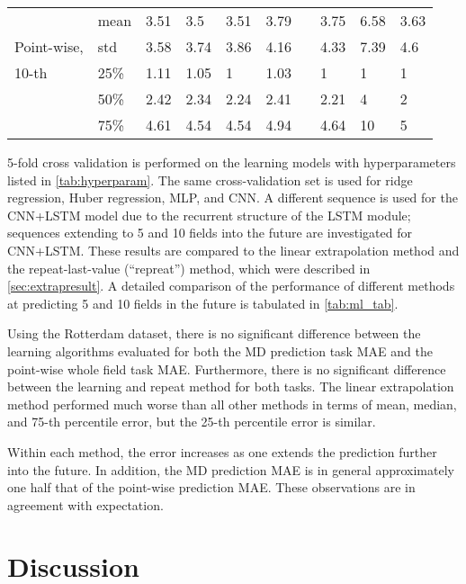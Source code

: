 \begin{table}[t]
\begin{tabular}{@{}llllllllll@{}}
		\midrule
		& mean & 3.51  & 3.5   & 3.51 & 3.79 &          & 3.75      & 6.58   & 3.63   \\
		Point-wise, & std  & 3.58  & 3.74  & 3.86 & 4.16 &          & 4.33      & 7.39   & 4.6    \\
		10-th& 25\% & 1.11  & 1.05  & 1    & 1.03 &          & 1         & 1      & 1      \\
		& 50\% & 2.42  & 2.34  & 2.24 & 2.41 &          & 2.21      & 4      & 2      \\
		& 75\% & 4.61  & 4.54  & 4.54 & 4.94 &          & 4.64      & 10     & 5      \\ \bottomrule
	\end{tabular}
\end{table}

5-fold cross validation is performed on the learning models with hyperparameters listed in \cref{tab:hyperparam}. The same cross-validation set is used for ridge regression, Huber regression, \ac{MLP}, and \ac{CNN}. A different sequence is used for the \acs{CNN}+\acs{LSTM} model due to the recurrent structure of the \ac{LSTM} module; sequences extending to 5 and 10 fields into the future are investigated for \acs{CNN}+\acs{LSTM}. These results are compared to the linear extrapolation method and the repeat-last-value (``repreat'') method, which were described in \cref{sec:extrapresult}. A detailed comparison of the performance of different methods at predicting 5 and 10 fields in the future is tabulated in \cref{tab:ml_tab}.

Using the Rotterdam dataset, there is no significant difference between the learning algorithms evaluated for both the \ac{MD} prediction task \ac{MAE} and the point-wise whole field task \ac{MAE}. Furthermore, there is no significant difference between the learning and repeat method for both tasks. The linear extrapolation method performed much worse than all other methods in terms of mean, median, and 75-th percentile error, but the 25-th percentile error is similar. 

Within each method, the error increases as one extends the prediction further into the future. In addition, the \ac{MD} prediction \ac{MAE} is in general approximately one half that of the point-wise prediction \ac{MAE}. These observations are in agreement with expectation. 

\section{Discussion}

